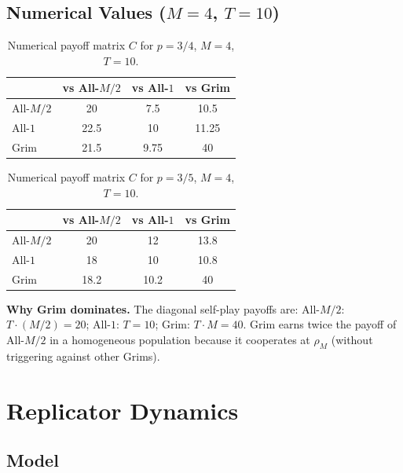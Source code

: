 \documentclass[12pt,a4paper]{article}
\begin{document}
\subsection{Numerical Values ($M=4$, $T=10$)}

\begin{table}[H]
\centering
\caption{Numerical payoff matrix $C$ for $p=3/4$, $M=4$, $T=10$.}
\label{tab:C_p075}
\begin{tabular}{lccc}
\toprule
           & vs All-$M/2$ & vs All-$1$ & vs Grim \\
\midrule
All-$M/2$  & 20    & 7.5   & 10.5   \\
All-$1$    & 22.5  & 10    & 11.25  \\
Grim       & 21.5  & 9.75  & 40     \\
\bottomrule
\end{tabular}
\end{table}

\begin{table}[H]
\centering
\caption{Numerical payoff matrix $C$ for $p=3/5$, $M=4$, $T=10$.}
\label{tab:C_p060}
\begin{tabular}{lccc}
\toprule
           & vs All-$M/2$ & vs All-$1$ & vs Grim \\
\midrule
All-$M/2$  & 20    & 12    & 13.8   \\
All-$1$    & 18    & 10    & 10.8   \\
Grim       & 18.2  & 10.2  & 40     \\
\bottomrule
\end{tabular}
\end{table}

\noindent\textbf{Why Grim dominates.} The diagonal self-play payoffs are:
All-$M/2$: $T \cdot (M/2) = 20$; \quad All-$1$: $T = 10$; \quad
Grim: $T \cdot M = 40$.
Grim earns twice the payoff of All-$M/2$ in a homogeneous population because
it cooperates at $\rho_M$ (without triggering against other Grims).

\section{Replicator Dynamics}

\subsection{Model}
\end{document}
